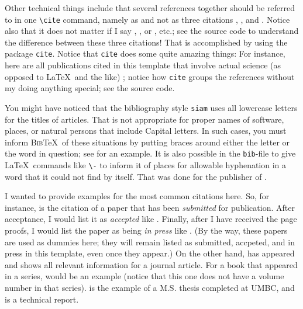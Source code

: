 \documentclass[12pt]{article}
\numberwithin{equation}{section}
\numberwithin{table}{section}
\numberwithin{figure}{section}
\begin{document}
Other technical things include that several references together should
be referred to in one \verb+\cite+ command, namely as
\cite{Goossens94,Graetzer1996,Lamport94} and not as three citations
\cite{Goossens94}, \cite{Graetzer1996}, and \cite{Lamport94}.
Notice also that it does not matter if I say
\cite{Goossens94,Graetzer1996,Lamport94},
\cite{Graetzer1996,Goossens94,Lamport94}, or
\cite{Lamport94,Goossens94,Graetzer1996}, etc.;
see the source code to understand the difference between these
three citations!
That is accomplished by using the package \verb+cite+.
Notice that \verb+cite+ does some quite amazing things:
For instance, here are all publications cited in this template
that involve actual science (as opposed to \LaTeX\ and the like)
\cite{Gobbert,GoPr1,GoPr2,Gobbertima2000,Gobbertsiap2000,Ho95,Iserles96,RaimGobbert2010Poisson,Sharmathesis2010};
notice how \verb+cite+ groups the references without my doing
anything special; see the source code.

You might have noticed that the bibliography style \verb+siam+
uses all lowercase letters for the titles of articles.
That is not appropriate for proper names of software, places, or
natural persons that include Capital letters. In such cases,
you must inform \textsc{Bib}\TeX\ of these situations by putting
braces around either the letter or the word in question; see
\cite{Gobbertsiap2000} for an example.
It is also possible in the \verb+bib+-file to give \LaTeX\ commands like
\verb+\-+ to inform it of places for allowable hyphenation in a word that
it could not find by itself. That was done for the publisher of
\cite{Graetzer1996}.

I wanted to provide examples for the most common citations here.
So, for instance, \cite{Gobbertsiap2000} is the citation of a paper that
has been \emph{submitted} for publication. After acceptance, I would list
it as \emph{accepted} like \cite{Gobbertiwce}.
Finally, after I have received the page proofs,
I would list the paper as being \emph{in press} like \cite{Gobbertjcp2004}.
(By the way, these papers are used as dummies here; they will remain
listed as submitted, accpeted, and in press in this template,
even once they appear.) On the other
hand, \cite{GoPr1} has appeared and shows all relevant information for
a journal article. For a book that appeared in a series,
\cite{Iserles96} would be an example (notice that this
one does not have a volume number in that series).
\cite{Sharmathesis2010} is the example of a M.S. thesis completed at UMBC,
and \cite{RaimGobbert2010Poisson} is a technical report.
\end{document}

